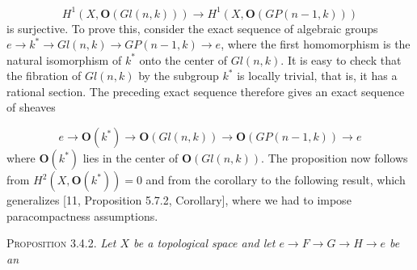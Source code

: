 \[
H^1(X,\mathbf O(\mathit{Gl}(n,k)))
\to
H^1(X,\mathbf O(\mathit{GP}(n-1,k)))
\]
is surjective. To prove this, consider the exact sequence of algebraic groups
$e\to k^*\to\mathit{Gl}(n,k)\to\mathit{GP}(n-1,k)\to e$,
where the first homomorphism is the natural isomorphism of $k^*$ onto the
center of $\mathit{Gl}(n,k)$. It is easy to check that the fibration of
$\mathit{Gl}(n,k)$ by the subgroup $k^*$ is locally trivial, that is,
it has a rational section. The preceding exact sequence therefore gives an
exact sequence of sheaves

\[
e\to\mathbf O(k^*)
\to\mathbf O(\mathit{Gl}(n,k))
\to\mathbf O(\mathit{GP}(n-1,k))
\to e
\]
where $\mathbf O(k^*)$ lies in the center of
$\mathbf O(\mathit{Gl}(n,k))$. The proposition now follows from
$H^2(X,\mathbf O(k^*))=0$ and from the corollary to the following result,
which generalizes [11, Proposition 5.7.2, Corollary], where we had to impose
paracompactness assumptions.

\indent\textsc{Proposition 3.4.2.} \textit{Let $X$ be a topological space and
let $e\to F\to G\to H\to e$
be an}

\endgroup
